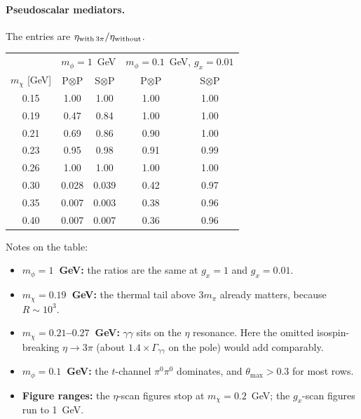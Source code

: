 \documentclass{article}
\newcommand{\mpi}{m_\pi}
\begin{document}
\paragraph{Pseudoscalar mediators.}
The entries are $\eta_{\rm with\,3\pi}/\eta_{\rm without}$.
\begin{center}
\begin{tabular}{c|cc|cc}
\toprule
 & \multicolumn{2}{c|}{$m_\phi=1$~GeV} & \multicolumn{2}{c}{$m_\phi=0.1$~GeV, $g_x=0.01$}\\
$m_\chi$ [GeV] & P$\otimes$P & S$\otimes$P & P$\otimes$P & S$\otimes$P\\
\midrule
0.15 & 1.00 & 1.00 & 1.00 & 1.00\\
0.19 & 0.47 & 0.84 & 1.00 & 1.00\\
0.21 & 0.69 & 0.86 & 0.90 & 1.00\\
0.23 & 0.95 & 0.98 & 0.91 & 0.99\\
0.26 & 1.00 & 1.00 & 1.00 & 1.00\\
0.30 & 0.028 & 0.039 & 0.42 & 0.97\\
0.35 & 0.007 & 0.003 & 0.38 & 0.96\\
0.40 & 0.007 & 0.007 & 0.36 & 0.96\\
\bottomrule
\end{tabular}
\end{center}
Notes on the table:
\begin{itemize}
\item \textbf{$m_\phi=1$~GeV:} the ratios are the same at $g_x=1$ and $g_x=0.01$.
\item \textbf{$m_\chi=0.19$~GeV:} the thermal tail above $3\mpi$ already matters, because $R\sim10^3$.
\item \textbf{$m_\chi=0.21$--$0.27$~GeV:} $\gamma\gamma$ sits on the $\eta$ resonance. Here the
  omitted isospin-breaking $\eta\to3\pi$ (about $1.4\times\Gamma_{\gamma\gamma}$ on the pole) would
  add comparably.
\item \textbf{$m_\phi=0.1$~GeV:} the $t$-channel $\pi^0\pi^0$ dominates, and $\theta_{\max}>0.3$
  for most rows.
\item \textbf{Figure ranges:} the $\eta$-scan figures stop at $m_\chi=0.2$~GeV; the $g_x$-scan
  figures run to 1~GeV.
\end{itemize}
\end{document}
